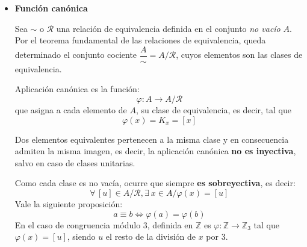 \begin{itemize}
	\item \textbf{Función canónica}
	
	Sea $\sim$ o $\mathcal{R}$ una relación de equivalencia definida en el conjunto \textit{no vacío}
	$A$. Por el teorema fundamental de las relaciones de equivalencia, queda determinado
	el conjunto cociente $\dfrac{A}{\sim} = A/ \mathcal{R}$, cuyos elementos son las clases de equivalencia.
	
	\begin{fmd-definition}
		Aplicación canónica es la función:
		\[ \varphi: A \rightarrow A / \mathcal{R} \]
		que asigna a cada elemento de $A$, su clase de equivalencia, es decir, tal que 
		\[ \varphi(x) = K_x = [x] \]
	\end{fmd-definition}
	
	Dos elementos equivalentes pertenecen a la misma clase y en consecuencia admiten la misma imagen, es decir, la aplicación canónica \textbf{no es inyectiva}, salvo en caso de clases unitarias.
	
	Como cada clase es no vacía, ocurre que siempre \textbf{es sobreyectiva}, es
	decir:
	\[ \forall \, [u] \in A / \mathcal{R}, \exists \ x \in A / \varphi(x) = [u]  \]
	Vale la siguiente proposición:
	\[ a \equiv b \iff \varphi(a) = \varphi(b)\]
	En el caso de congruencia módulo 3, definida en $\mathbb{Z}$ es
	$\varphi: \mathbb{Z} \rightarrow \mathbb{Z}_3$ tal que $\varphi(x) = [u]$, siendo 
	$u$ el resto de la división de $x$ por 3.
\end{itemize}

